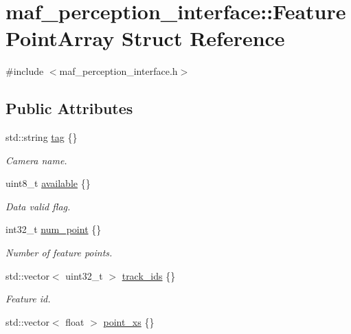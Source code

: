\hypertarget{structmaf__perception__interface_1_1FeaturePointArray}{}\section{maf\+\_\+perception\+\_\+interface\+:\+:Feature\+Point\+Array Struct Reference}
\label{structmaf__perception__interface_1_1FeaturePointArray}


{\ttfamily \#include $<$maf\+\_\+perception\+\_\+interface.\+h$>$}

\subsection*{Public Attributes}
\begin{DoxyCompactItemize}
\item 
std\+::string \hyperlink{structmaf__perception__interface_1_1FeaturePointArray_a0e4defbbd6989cfaf50a1bf702a01c7f}{tag} \{\}
\begin{DoxyCompactList}\small\item\em Camera name. \end{DoxyCompactList}\item 
uint8\+\_\+t \hyperlink{structmaf__perception__interface_1_1FeaturePointArray_ac1e6f64b23956e4cb567312f4bf3b599}{available} \{\}
\begin{DoxyCompactList}\small\item\em Data valid flag. \end{DoxyCompactList}\item 
int32\+\_\+t \hyperlink{structmaf__perception__interface_1_1FeaturePointArray_a937530b23373c7501c54b560312ed27c}{num\+\_\+point} \{\}
\begin{DoxyCompactList}\small\item\em Number of feature points. \end{DoxyCompactList}\item 
std\+::vector$<$ uint32\+\_\+t $>$ \hyperlink{structmaf__perception__interface_1_1FeaturePointArray_a89af7c5009bac73ed1c9339062672660}{track\+\_\+ids} \{\}
\begin{DoxyCompactList}\small\item\em Feature id. \end{DoxyCompactList}\item 
std\+::vector$<$ float $>$ \hyperlink{structmaf__perception__interface_1_1FeaturePointArray_ad3eb5be9b05d8457a0e5f81205eb19f9}{point\+\_\+xs} \{\}

\end{DoxyCompactItemize}
